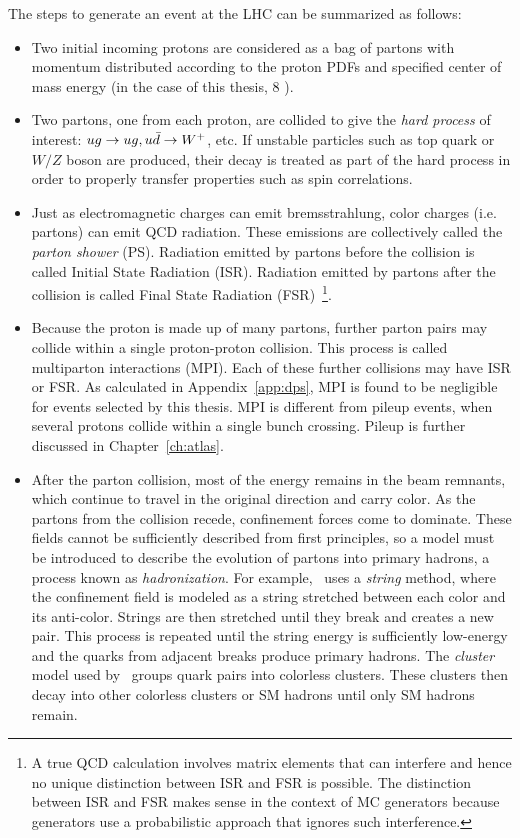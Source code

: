 The steps to generate an event at the LHC can be summarized as follows:
\begin{itemize}
\item Two initial incoming protons are considered as a bag of partons with momentum distributed according to the proton PDFs and specified center of mass energy (in the case of this thesis, 8 \tev).
\item Two partons, one from each proton, are collided to give the \emph{hard process} of interest: $ug \rightarrow ug, u\bar{d}\rightarrow W^{+}$, etc. If unstable particles such as top quark or $W/Z$ boson are produced, their decay is treated as part of the hard process in order to properly transfer properties such as spin correlations.
\item Just as electromagnetic charges can emit bremsstrahlung, color charges (i.e. partons) can emit QCD radiation. These emissions are collectively called the \emph{parton shower} (PS). Radiation emitted by partons before the collision is called Initial State Radiation (ISR). Radiation emitted by partons after the collision is called Final State Radiation (FSR)~\footnote{A true QCD calculation involves matrix elements that can interfere and hence no unique distinction between ISR and FSR is possible. The distinction between ISR and FSR makes sense in the context of MC generators because generators use a probabilistic approach that ignores such interference.}.  
\item Because the proton is made up of many partons, further parton pairs may collide within a single proton-proton collision. This process is called multiparton interactions (MPI). Each of these further collisions may have ISR or FSR. As calculated in Appendix~\ref{app:dps}, MPI is found to be negligible for events selected by this thesis. MPI is different from pileup events, when several protons collide within a single bunch crossing. Pileup is further discussed in Chapter~\ref{ch:atlas}.
\item After the parton collision, most of the energy remains in the beam remnants, which continue to travel in the original direction and carry color. As the partons from the collision recede, confinement forces come to dominate. These fields cannot be sufficiently described from first principles, so a model must be introduced to describe the evolution of partons into primary hadrons, a process known as \emph{hadronization}. For example, \py\ uses a \emph{string} method, where the confinement field is modeled as a string stretched between each color and its anti-color. Strings are then stretched until they break and creates a new pair. This process is repeated until the string energy is sufficiently low-energy and the quarks from adjacent breaks produce primary hadrons. The \emph{cluster} model used by \hw\ groups quark pairs into colorless clusters. These clusters then decay into other colorless clusters or SM hadrons until only SM hadrons remain.

\end{itemize}
